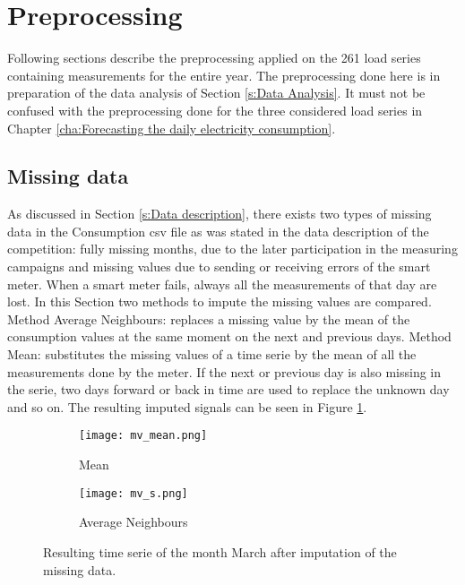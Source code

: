 \section{Preprocessing}\label{s:Preprocessing}

Following sections describe the preprocessing applied on the 261 load series containing measurements for the entire year. The preprocessing done here is in preparation of the data analysis of Section \ref{s:Data Analysis}. It must not be confused with the preprocessing done for the three considered load series in Chapter \ref{cha:Forecasting the daily electricity consumption}.

\subsection{Missing data} \label{s:missing_data}
As discussed in Section \ref{s:Data description}, there exists two types of missing data in the Consumption csv file as was stated in the data description of the competition: fully missing months, due to the later participation in the measuring campaigns and missing values due to sending or receiving errors of the smart meter. When a smart meter fails, always all the measurements of that day are lost. In this Section two methods to impute the missing values are compared. Method Average Neighbours: replaces a missing value by the mean of the consumption values at the same moment on the next and previous days. Method Mean: substitutes the missing values of a time serie by the mean of all the measurements done by the meter. If the next or previous day is also missing in the serie, two days forward or back in time are used to replace the unknown day and so on. The resulting imputed signals can be seen in Figure \ref{fig:missing_values_imputing}. \\

\begin{figure}[h]
	\begin{subfigure}{0.5\textwidth}
		\texttt{[image: mv\_mean.png]}
		\caption{Mean}
	\end{subfigure}	
	\begin{subfigure}{0.5\textwidth}
		\texttt{[image: mv\_s.png]}
		\caption{Average Neighbours}
	\end{subfigure}
	\caption{Resulting time serie of the month March after imputation of the missing data.}
	\label{fig:missing_values_imputing}
\end{figure}

